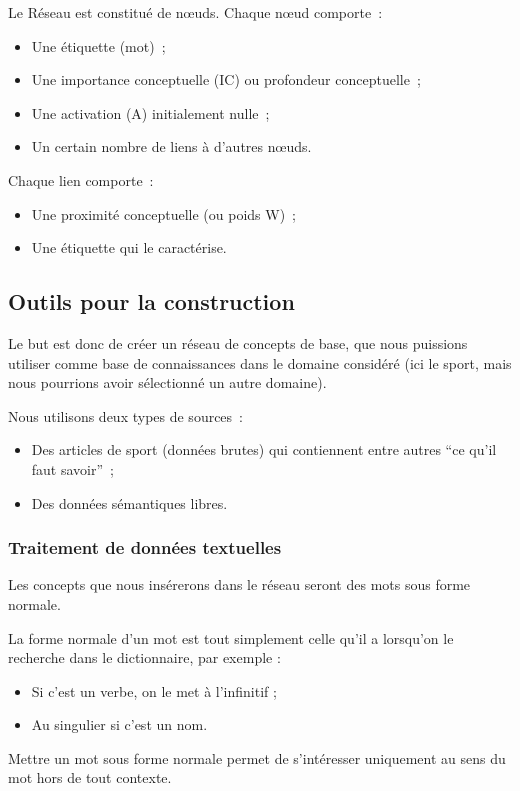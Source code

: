 \documentclass[a4paper,12pt]{article}
\begin{document}
Le R\'eseau est constitué de n\oe{}uds. Chaque n\oe{}ud comporte~:
\begin{itemize}
  \item Une étiquette (mot)~;
 \item Une importance conceptuelle (IC) ou profondeur conceptuelle~;
 \item Une activation (A) initialement nulle~;
 \item Un certain nombre de liens à d'autres n\oe{}uds.
\end{itemize}

Chaque lien comporte~:
\begin{itemize}
 \item Une proximité conceptuelle (ou poids W)~;
 \item Une étiquette qui le caract\'erise.
\end{itemize}

\subsection{Outils pour la construction}

Le but est donc de créer un réseau de concepts de base, que nous puissions utiliser comme base de connaissances dans le domaine considéré (ici le sport, mais nous pourrions avoir sélectionné un autre domaine).

Nous utilisons deux types de sources~:
\begin{itemize}
 \item Des articles de sport (données brutes) qui contiennent entre autres ``ce qu'il faut savoir''~;
 \item Des données sémantiques libres.
\end{itemize}


\subsubsection{Traitement de donn\'ees textuelles}

Les concepts que nous ins\'ererons dans le r\'eseau seront des mots sous forme normale.

\begin{definition}
La forme normale d'un mot est tout simplement celle qu'il a lorsqu'on le recherche dans le dictionnaire, par exemple :
\begin{itemize}
 \item Si c'est un verbe, on le met \`a l'infinitif ;
 \item Au singulier si c'est un nom.
\end{itemize}
Mettre un mot sous forme normale permet de s'int\'eresser uniquement au sens du mot hors de tout contexte.
\end{definition}
\end{document}
